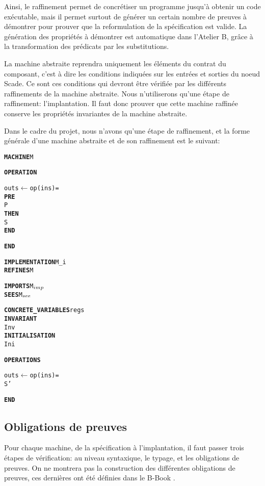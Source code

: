 Ainsi, le raffinement permet de concrétiser un programme jusqu'à obtenir un code
exécutable, mais il permet surtout de générer un certain nombre de preuves à
démontrer pour prouver que la reformulation de la spécification est valide.
La génération des propriétés à démontrer est automatique dans l'Atelier B, grâce à la
transformation des prédicats par les substitutions. 

La machine abstraite reprendra uniquement les éléments du contrat du composant,
c'est à dire les conditions indiquées sur les entrées et sorties du noeud
Scade. Ce sont ces conditions qui devront être vérifiée par les différents
raffinements de la machine abstraite. Nous n'utiliserons qu'une étape de
raffinement: l'implantation. Il faut donc prouver que cette machine raffinée
conserve les propriétés invariantes de la machine abstraite.

Dans le cadre du projet, nous n'avons qu'une étape de raffinement, et la forme
générale d'une machine abstraite et de son raffinement est le suivant: 



\setlength{\columnseprule}{0.05cm}
\begin{multicols}{2}
\begin{alltt}
\textbf{MACHINE} M

\textbf{OPERATION}

outs \(\leftarrow\) op(ins) =
  \textbf{PRE}
    P
  \textbf{THEN}
    S
  \textbf{END}

\textbf{END}
\end{alltt}
\columnbreak
\begin{alltt}
\textbf{IMPLEMENTATION} M\_i
\textbf{REFINES} M

\textbf{IMPORTS} M\(\sb{imp}\)
\textbf{SEES} M\(\sb{see}\)

\textbf{CONCRETE\_VARIABLES} regs
\textbf{INVARIANT}
  Inv
\textbf{INITIALISATION}
  Ini

\textbf{OPERATIONS}
  
outs \(\leftarrow\) op(ins) =
  S'

\textbf{END}
\end{alltt}
\end{multicols}



\subsection{Obligations de preuves}

Pour chaque machine, de la spécification à l'implantation, il faut
passer trois étapes de vérification: au niveau syntaxique, le typage, et les obligations de preuves.  
On ne montrera pas la construction des différentes obligations de
preuves, ces dernières ont été définies dans le B-Book \cite{JRA}. 

